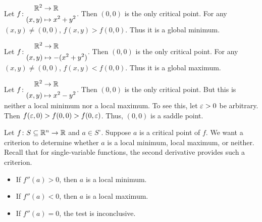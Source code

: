 
\begin{examples}
    \item Let $f\colon \begin{aligned}
        \mathbb{R}^2 &\to \mathbb{R} \\
        (x, y) &\mapsto x^2 + y^2
    \end{aligned}$. Then $(0, 0)$ is the only critical point.
    For any $(x, y) \ne (0, 0)$, $f(x, y) > f(0, 0)$.
    Thus it is a global minimum.
    \item Let $f\colon \begin{aligned}
        \mathbb{R}^2 &\to \mathbb{R} \\
        (x, y) &\mapsto -(x^2 + y^2)
    \end{aligned}$. Then $(0, 0)$ is the only critical point.
    For any $(x, y) \ne (0, 0)$, $f(x, y) < f(0, 0)$.
    Thus it is a global maximum.
    \item Let $f\colon \begin{aligned}
        \mathbb{R}^2 &\to \mathbb{R} \\
        (x, y) &\mapsto x^2 - y^2
    \end{aligned}$. Then $(0, 0)$ is the only critical point.
    But this is neither a local minimum nor a local maximum.
    To see this, let $\varepsilon > 0$ be arbitrary.
    Then $f(\varepsilon, 0) > f(0, 0) > f(0, \varepsilon)$.
    Thus, $(0, 0)$ is a saddle point.
\end{examples}

Let $f\colon S \subseteq \mathbb{R}^n \to \mathbb{R}$ and $a \in S^\circ$.
Suppose $a$ is a critical point of $f$.
We want a criterion to determine whether $a$ is a local minimum,
local maximum, or neither.
Recall that for single-variable functions, the second derivative provides
such a criterion.
\begin{itemize}
    \item If $f''(a) > 0$, then $a$ is a local minimum.
    \item If $f''(a) < 0$, then $a$ is a local maximum.
    \item If $f''(a) = 0$, the test is inconclusive.
\end{itemize}

